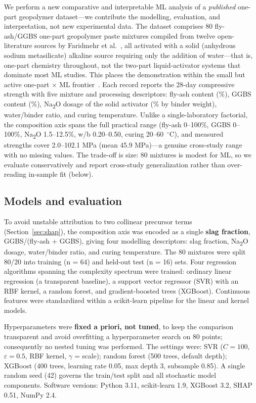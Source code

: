 \documentclass[materials,article,submit,pdftex,moreauthors]{Definitions/mdpi}
\begin{document}
We perform a new comparative and interpretable ML analysis of a \emph{published} one-part geopolymer dataset---we contribute the modelling, evaluation, and interpretation, not new experimental data. The dataset comprises 80 fly-ash/GGBS one-part geopolymer paste mixtures compiled from twelve open-literature sources by Faridmehr et al.~\cite{ref27}, all activated with a solid (anhydrous sodium metasilicate) alkaline source requiring only the addition of water---that is, one-part chemistry throughout, not the two-part liquid-activator systems that dominate most ML studies. This places the demonstration within the small but active one-part $\times$ ML frontier~\cite{ref26,ref28,ref31,ref33,ref36,ref37}. Each record reports the 28-day compressive strength with five mixture and processing descriptors: fly-ash content (\%), GGBS content (\%), Na\textsubscript{2}O dosage of the solid activator (\% by binder weight), water/binder ratio, and curing temperature. Unlike a single-laboratory factorial, the composition axis spans the full practical range (fly-ash 0--100\%, GGBS 0--100\%, Na\textsubscript{2}O 1.5--12.5\%, w/b 0.20--0.50, curing 20--60~$^\circ$C), and measured strengths cover 2.0--102.1 MPa (mean 45.9 MPa)---a genuine cross-study range with no missing values. The trade-off is size: 80 mixtures is modest for ML, so we evaluate conservatively and report cross-study generalization rather than over-reading in-sample fit (below).

\subsection{Models and evaluation}

To avoid unstable attribution to two collinear precursor terms (Section~\ref{sec:shap}), the composition axis was encoded as a single \textbf{slag fraction}, GGBS/(fly-ash + GGBS), giving four modelling descriptors: slag fraction, Na\textsubscript{2}O dosage, water/binder ratio, and curing temperature. The 80 mixtures were split 80/20 into training (n = 64) and held-out test (n = 16) sets. Four regression algorithms spanning the complexity spectrum were trained: ordinary linear regression (a transparent baseline), a support vector regressor (SVR) with an RBF kernel, a random forest, and gradient-boosted trees (XGBoost). Continuous features were standardized within a scikit-learn pipeline for the linear and kernel models.

Hyperparameters were \textbf{fixed a priori, not tuned}, to keep the comparison transparent and avoid overfitting a hyperparameter search on 80 points; consequently no nested tuning was performed. The settings were: SVR ($C = 100$, $\varepsilon = 0.5$, RBF kernel, $\gamma$ = scale); random forest (500 trees, default depth); XGBoost (400 trees, learning rate 0.05, max depth 3, subsample 0.85). A single random seed (42) governs the train/test split and all stochastic model components. Software versions: Python 3.11, scikit-learn 1.9, XGBoost 3.2, SHAP 0.51, NumPy 2.4.
\end{document}

